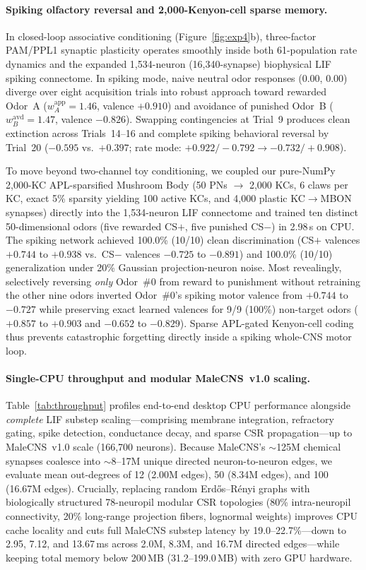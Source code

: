 \documentclass[10pt,twocolumn,letterpaper]{article}
\begin{document}
\paragraph{Spiking olfactory reversal and 2,000-Kenyon-cell sparse memory.}
In closed-loop associative conditioning (Figure~\ref{fig:exp4}b), three-factor PAM/PPL1 synaptic plasticity operates smoothly inside both 61-population rate dynamics and the expanded 1,534-neuron (16,340-synapse) biophysical LIF spiking connectome. In spiking mode, naive neutral odor responses (0.00, 0.00) diverge over eight acquisition trials into robust approach toward rewarded Odor~A ($w_A^{\mathrm{app}}=1.46$, valence $+0.910$) and avoidance of punished Odor~B ($w_B^{\mathrm{avd}}=1.47$, valence $-0.826$). Swapping contingencies at Trial~9 produces clean extinction across Trials~14--16 and complete spiking behavioral reversal by Trial~20 ($-0.595$ vs.\ $+0.397$; rate mode: $+0.922 / -0.792 \to -0.732 / +0.908$).

To move beyond two-channel toy conditioning, we coupled our pure-NumPy 2,000-KC APL-sparsified Mushroom Body (50 PNs $\to$ 2,000 KCs, 6 claws per KC, exact 5\% sparsity yielding 100 active KCs, and 4,000 plastic KC$\to$MBON synapses) directly into the 1,534-neuron LIF connectome and trained ten distinct 50-dimensional odors (five rewarded CS$+$, five punished CS$-$) in 2.98\,s on CPU. The spiking network achieved 100.0\% (10/10) clean discrimination (CS$+$ valences $+0.744$ to $+0.938$ vs.\ CS$-$ valences $-0.725$ to $-0.891$) and 100.0\% (10/10) generalization under 20\% Gaussian projection-neuron noise. Most revealingly, selectively reversing \emph{only} Odor~\#0 from reward to punishment without retraining the other nine odors inverted Odor~\#0's spiking motor valence from $+0.744$ to $-0.727$ while preserving exact learned valences for 9/9 (100\%) non-target odors ($+0.857$ to $+0.903$ and $-0.652$ to $-0.829$). Sparse APL-gated Kenyon-cell coding thus prevents catastrophic forgetting directly inside a spiking whole-CNS motor loop.

\paragraph{Single-CPU throughput and modular MaleCNS~v1.0 scaling.}
Table~\ref{tab:throughput} profiles end-to-end desktop CPU performance alongside \emph{complete} LIF substep scaling---comprising membrane integration, refractory gating, spike detection, conductance decay, and sparse CSR propagation---up to MaleCNS~v1.0 scale (166,700 neurons). Because MaleCNS's $\sim$125M chemical synapses coalesce into $\sim$8--17M unique directed neuron-to-neuron edges, we evaluate mean out-degrees of 12 (2.00M edges), 50 (8.34M edges), and 100 (16.67M edges). Crucially, replacing random Erd\H{o}s--R\'enyi graphs with biologically structured 78-neuropil modular CSR topologies (80\% intra-neuropil connectivity, 20\% long-range projection fibers, lognormal weights) improves CPU cache locality and cuts full MaleCNS substep latency by 19.0--22.7\%---down to 2.95, 7.12, and 13.67\,ms across 2.0M, 8.3M, and 16.7M directed edges---while keeping total memory below 200\,MB (31.2--199.0\,MB) with zero GPU hardware.
\end{document}

